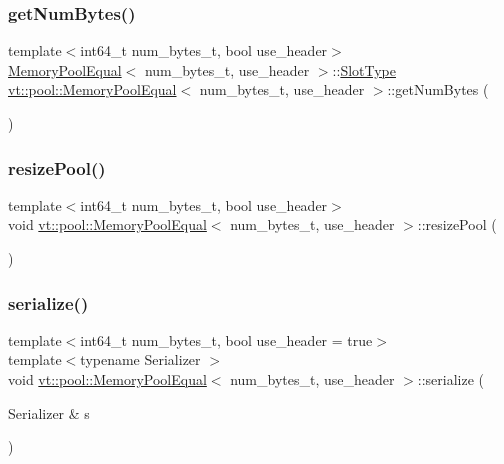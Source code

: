 \subsubsection{\texorpdfstring{get\+Num\+Bytes()}{getNumBytes()}}
{\footnotesize\ttfamily template$<$int64\+\_\+t num\+\_\+bytes\+\_\+t, bool use\+\_\+header$>$ \\
\hyperlink{structvt_1_1pool_1_1_memory_pool_equal}{Memory\+Pool\+Equal}$<$ num\+\_\+bytes\+\_\+t, use\+\_\+header $>$\+::\hyperlink{structvt_1_1pool_1_1_memory_pool_equal_af05a2c24c95c666b20e3758745be746b}{Slot\+Type} \hyperlink{structvt_1_1pool_1_1_memory_pool_equal}{vt\+::pool\+::\+Memory\+Pool\+Equal}$<$ num\+\_\+bytes\+\_\+t, use\+\_\+header $>$\+::get\+Num\+Bytes (\begin{DoxyParamCaption}{ }\end{DoxyParamCaption})}

\mbox{\label{structvt_1_1pool_1_1_memory_pool_equal_a42ba3ac19921517b82c4e6ff4cba6b80}} 
\subsubsection{\texorpdfstring{resize\+Pool()}{resizePool()}}
{\footnotesize\ttfamily template$<$int64\+\_\+t num\+\_\+bytes\+\_\+t, bool use\+\_\+header$>$ \\
void \hyperlink{structvt_1_1pool_1_1_memory_pool_equal}{vt\+::pool\+::\+Memory\+Pool\+Equal}$<$ num\+\_\+bytes\+\_\+t, use\+\_\+header $>$\+::resize\+Pool (\begin{DoxyParamCaption}{ }\end{DoxyParamCaption})}

\mbox{\label{structvt_1_1pool_1_1_memory_pool_equal_a49e3617769cd0bdcb3957b93466595a3}} 
\subsubsection{\texorpdfstring{serialize()}{serialize()}}
{\footnotesize\ttfamily template$<$int64\+\_\+t num\+\_\+bytes\+\_\+t, bool use\+\_\+header = true$>$ \\
template$<$typename Serializer $>$ \\
void \hyperlink{structvt_1_1pool_1_1_memory_pool_equal}{vt\+::pool\+::\+Memory\+Pool\+Equal}$<$ num\+\_\+bytes\+\_\+t, use\+\_\+header $>$\+::serialize (\begin{DoxyParamCaption}\item[{Serializer \&}]{s }\end{DoxyParamCaption})\hspace{0.3cm}{\ttfamily [inline]}}




